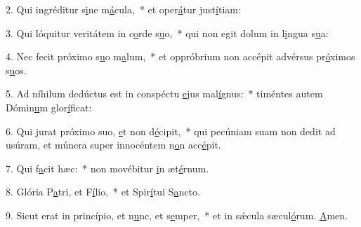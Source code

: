 2. Qui ingréditur s\uline{i}ne m\uline{á}cula,~* et oper\uline{á}tur just\uline{í}tiam:\par 
3. Qui lóquitur veritátem in c\uline{o}rde s\uline{u}o,~* qui non egit dolum in l\uline{i}ngua s\uline{u}a:\par 
4. Nec fecit próximo s\uline{u}o m\uline{a}lum,~* et oppróbrium non accépit advérsus pr\uline{ó}ximos s\uline{u}os.\par 
5. Ad níhilum dedúctus est in conspéctu \uline{e}jus mal\uline{í}gnus:~* timéntes autem Dómin\uline{u}m glor\uline{í}ficat:\par 
6. Qui jurat próximo suo, \uline{e}t non d\uline{é}cipit,~* qui pecúniam suam non dedit ad usúram, et múnera super innocéntem n\uline{o}n acc\uline{é}pit.\par 
7. Qui f\uline{a}cit hæc:~* non movébitur \uline{i}n æt\uline{é}rnum.\par 
8. Glória P\uline{a}tri, et F\uline{í}lio,~* et Spir\uline{í}tui S\uline{a}ncto.\par 
9. Sicut erat in princípio, et n\uline{u}nc, et s\uline{e}mper,~* et in sǽcula sæcul\uline{ó}rum. \uline{A}men.\par 
